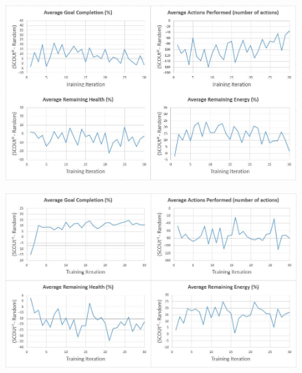 \begin{appxfig}[H]
\begin{figure}[H]
  \centering
  \includegraphics[width=0.9\columnwidth]{Figures/Results/TrainingVariation2/Hybrid-FindHuman.JPG}
\end{figure}
\caption{Iteration testing performance results for $SCOUt_{H}$ attempting \textit{Find Human} using setup variation 2 (see subsection~\ref{subsec:training_variations}). All graphs show the controller's average difference in performance compared to $Random$ ($SCOUt_{H}$ average - $Random$ average) VS the number of training iterations completed.}
\label{appendix:hybrid_training_fh_variation2}
\end{appxfig}


\begin{appxfig}[H]
\begin{figure}[H]
  \centering
  \includegraphics[width=0.9\columnwidth]{Figures/Results/TrainingVariation2/Hybrid-MapWater.JPG}
\end{figure}
\caption{Iteration testing performance results for $SCOUt_{H}$ attempting \textit{Map Water} using setup variation 2 (see subsection~\ref{subsec:training_variations}). All graphs show the controller's average difference in performance compared to $Random$ ($SCOUt_{H}$ average - $Random$ average) VS the number of training iterations completed.}
\label{appendix:hybrid_training_mw_variation2}
\end{appxfig}





